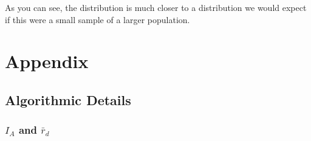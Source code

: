 \documentclass[letterpaper]{article}\usepackage[]{graphicx}\usepackage[]{color}
\begin{document}
As you can see, the distribution is much closer to a distribution we would expect if this were a small sample of a larger population. 


%
%
%
\section{Appendix}
\label{appendix}
%
\subsection{Algorithmic Details}
\label{appendix:algorithm}
\subsubsection{$I_A$ and $\bar r_d$}
\label{appendix:algorithm:iard}
\end{document}
